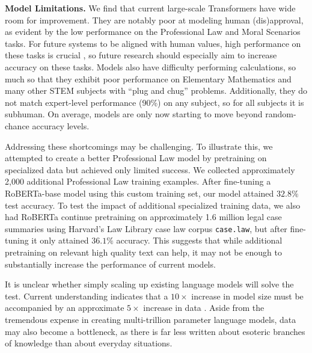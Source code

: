 \noindent\textbf{Model Limitations.}\quad
We find that current large-scale Transformers have wide room for improvement. They are notably poor at modeling human (dis)approval, as evident by the low performance on the Professional Law and Moral Scenarios tasks. For future systems to be aligned with human values, high performance on these tasks is crucial \citep{hendrycks2020ethicsdataset}, so future research should especially aim to increase accuracy on these tasks. Models also have difficulty performing calculations, so much so that they exhibit poor performance on Elementary Mathematics and many other STEM subjects with ``plug and chug'' problems. Additionally, they do not match expert-level performance (90\%) on any subject, so for all subjects it is subhuman. On average, models are only now starting to move beyond random-chance accuracy levels.

Addressing these shortcomings may be challenging. To illustrate this, we attempted to create a better Professional Law model by pretraining on specialized data but achieved only limited success. We collected approximately 2,000 additional Professional Law training examples. After fine-tuning a RoBERTa-base model \citep{RobertaLiu2019AR} using this custom training set, our model attained $32.8\%$ test accuracy. To test the impact of additional specialized training data, we also had RoBERTa continue pretraining on approximately 1.6 million legal case summaries using Harvard’s Law Library case law corpus \texttt{case.law}, but after fine-tuning it only attained $36.1\%$ accuracy. This suggests that while additional pretraining on relevant high quality text can help, it may not be enough to substantially increase the performance of current models. 

It is unclear whether simply scaling up existing language models will solve the test. Current understanding indicates that a $10\times$ increase in model size must be accompanied by an approximate $5\times$ increase in data \citep{kaplan2020scalinglaws}. Aside from the tremendous expense in creating multi-trillion parameter language models, data may also become a bottleneck, as there is far less written about esoteric branches of knowledge than about everyday situations.


